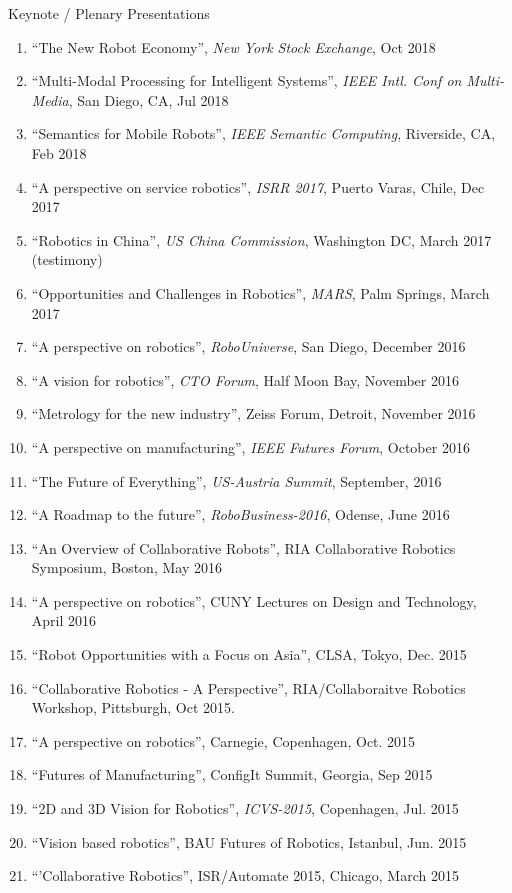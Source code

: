 \documentclass{article}
\begin{document}
\begin{cv}
\begin{cvlist}{Keynote / Plenary Presentations}
\begin{enumerate}
  \item ``The New Robot Economy'', {\em New York Stock Exchange}, Oct 2018
  \item ``Multi-Modal Processing for Intelligent Systems'', {\em IEEE Intl. Conf on Multi-Media},
          San Diego, CA, Jul 2018
  \item ``Semantics for Mobile Robots'', {\em IEEE Semantic Computing}, Riverside, CA, Feb 2018
  \item ``A perspective on service robotics'', {\em ISRR 2017}, Puerto Varas, Chile, Dec 2017
  \item ``Robotics in China'', {\em US China Commission}, Washington DC, March 2017 (testimony)
  \item ``Opportunities and Challenges in Robotics'', {\em MARS}, Palm Springs, March 2017
  \item ``A perspective on robotics'', {\em RoboUniverse}, San Diego,  December 2016
  \item ``A vision for robotics'', {\em CTO Forum}, Half Moon Bay, November 2016
  \item ``Metrology for the new industry'', Zeiss Forum, Detroit,  November 2016
  \item ``A perspective on manufacturing'', {\em IEEE Futures Forum},  October 2016
  \item ``The Future of Everything'', {\em US-Austria Summit},  September, 2016
  \item ``A Roadmap to the future'', {\em RoboBusiness-2016}, Odense,  June 2016
  \item ``An Overview of Collaborative Robots'', RIA Collaborative Robotics Symposium, Boston, May 2016
  \item ``A perspective on robotics'', CUNY Lectures on Design and Technology, April 2016
  \item ``Robot Opportunities with a Focus on Asia'', CLSA, Tokyo,  Dec. 2015
  \item ``Collaborative Robotics - A Perspective'', RIA/Collaboraitve Robotics Workshop, Pittsburgh, Oct 2015.
  \item ``A perspective on robotics'', Carnegie, Copenhagen, Oct. 2015
  \item ``Futures of Manufacturing'', ConfigIt Summit, Georgia, Sep 2015
  \item ``2D and 3D Vision for Robotics'', {\em ICVS-2015}, Copenhagen, Jul. 2015
  \item ``Vision based robotics'', BAU Futures of Robotics, Istanbul, Jun. 2015
  \item ``'Collaborative Robotics'', ISR/Automate 2015, Chicago, March 2015

\end{enumerate}
\end{cvlist}
\end{cv}
\end{document}
